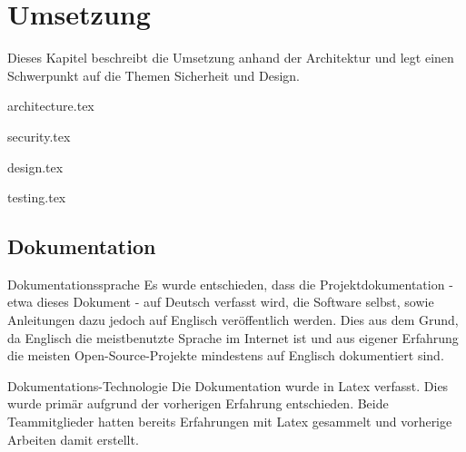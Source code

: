 \begin{comment}
(Implementierung) Architektur und Design beschrieben: Mit begründeten Architekturentscheidungen, mit Diskussion, wie Qualitätsattribute sichergestellt wurden (welche Qualität wurde erreicht?), mit Dokumentation, welche Experimente/Tests durchgeführt wurden und welche Lösungsoptionen aufgrund der Ergebnisse dieser Experimente/Tests
verworfen wurden (was ging schief?)
\end{comment}

\chapter{Umsetzung} \label{sec:implementation}

Dieses Kapitel beschreibt die Umsetzung anhand der Architektur und legt einen Schwerpunkt auf die Themen Sicherheit und Design.

{architecture.tex}

\clearpage
{security.tex}

\clearpage
{design.tex}

\clearpage
{testing.tex}

\section{Dokumentation} \label{sec:implementation:documentation}

\begin{decision}{Dokumentationssprache}
Es wurde entschieden, dass die Projektdokumentation - etwa dieses Dokument - auf Deutsch verfasst wird, die Software selbst, sowie Anleitungen dazu jedoch auf Englisch veröffentlich werden. Dies aus dem Grund, da Englisch die meistbenutzte Sprache im Internet ist \cite{websitelanguages} und aus eigener Erfahrung die meisten Open-Source-Projekte mindestens auf Englisch dokumentiert sind.
\end{decision}

\begin{decision}{Dokumentations-Technologie}
Die Dokumentation wurde in Latex verfasst. Dies wurde primär aufgrund der vorherigen Erfahrung entschieden. Beide Teammitglieder hatten bereits Erfahrungen mit Latex gesammelt und vorherige Arbeiten damit erstellt.
\end{decision}